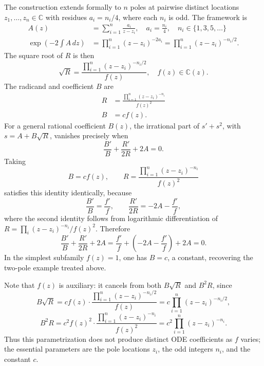 \documentclass[11pt,a4paper]{article}
\theoremstyle{definition}
\begin{document}
The construction extends formally to \(n\) poles at pairwise distinct locations \(z_1, \dots, z_n \in \mathbb{C}\) with residues \(a_i = n_i/4\), where each \(n_i\) is odd. The framework is
\begin{align}
A(z) &= \sum_{i=1}^{n} \frac{a_i}{z-z_i}, \quad a_i = \frac{n_i}{4}, \quad n_i \in \{1, 3, 5, \dots\} \\
\exp\left(-2\int A\,dz\right) &= \prod_{i=1}^{n} (z-z_i)^{-2a_i} = \prod_{i=1}^{n} (z-z_i)^{-n_i/2}.
\end{align}
The square root of \(R\) is then
\begin{equation}
\sqrt{R} = \frac{\prod_{i=1}^{n} (z-z_i)^{-n_i/2}}{f(z)}, \quad f(z) \in \mathbb{C}(z).
\end{equation}
The radicand and coefficient \(B\) are
\begin{align}
R &= \frac{\prod_{i=1}^{n} (z-z_i)^{-n_i}}{f(z)^2} \\
B &= c f(z).
\end{align}
For a general rational coefficient \(B(z)\), the irrational part of \(s'+s^2\), with \(s=A+B\sqrt{R}\), vanishes precisely when
\begin{equation}
\frac{B'}{B} + \frac{R'}{2R} + 2A = 0.
\end{equation}
Taking
\begin{equation}
B = cf(z), \qquad R = \frac{\prod_{i=1}^{n}(z-z_i)^{-n_i}}{f(z)^2}
\end{equation}
satisfies this identity identically, because
\begin{equation}
\frac{B'}{B} = \frac{f'}{f}, \qquad \frac{R'}{2R} = -2A - \frac{f'}{f},
\end{equation}
where the second identity follows from logarithmic differentiation of \(R = \prod_i (z-z_i)^{-n_i} / f(z)^2\). Therefore
\begin{equation}
\frac{B'}{B} + \frac{R'}{2R} + 2A = \frac{f'}{f} + \left(-2A - \frac{f'}{f}\right) + 2A = 0.
\end{equation}
In the simplest subfamily \(f(z)=1\), one has \(B=c\), a constant, recovering the two-pole example treated above.

Note that \(f(z)\) is auxiliary: it cancels from both \(B\sqrt{R}\) and \(B^2R\), since
\begin{equation}
B\sqrt{R} = cf(z) \cdot \frac{\prod_{i=1}^{n}(z-z_i)^{-n_i/2}}{f(z)} = c\prod_{i=1}^{n}(z-z_i)^{-n_i/2},
\end{equation}
\begin{equation}
B^2R = c^2 f(z)^2 \cdot \frac{\prod_{i=1}^{n}(z-z_i)^{-n_i}}{f(z)^2} = c^2\prod_{i=1}^{n}(z-z_i)^{-n_i}.
\end{equation}
Thus this parametrization does not produce distinct ODE coefficients as \(f\) varies; the essential parameters are the pole locations \(z_i\), the odd integers \(n_i\), and the constant \(c\).
\end{document}
